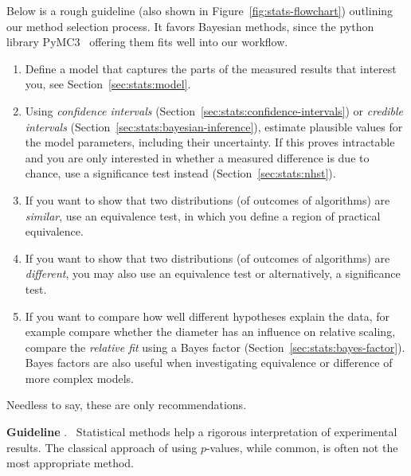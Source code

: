 \documentclass[algorithms,article,submit,moreauthors,pdftex]{Definitions/mdpi}
\newcounter{guideline}
\newcommand{\changed}[1]{#1}
\newcommand{\guideline}[1]{\par\smallskip\textbf{Guideline \theguideline\stepcounter{guideline}}.
\ #1\par\smallskip}
\begin{document}
Below is a rough guideline (also shown in Figure~\ref{fig:stats-flowchart}) outlining our method selection process.
It favors Bayesian methods, since the python library PyMC3~\cite{salvatier2016probabilistic} offering them fits well into our workflow.
\begin{enumerate}
\item Define a model that captures the parts of the measured results that interest you, see Section~\ref{sec:stats:model}.
\item Using \emph{confidence intervals} (Section~\ref{sec:stats:confidence-intervals}) or \emph{credible intervals} (Section~\ref{sec:stats:bayesian-inference}), estimate plausible values for the model parameters, including their uncertainty.
If this proves intractable and you are only interested in whether a measured difference is due to chance, use a significance test instead (Section~\ref{sec:stats:nhst}).
\item If you want to show that two distributions (of outcomes of algorithms) are \emph{similar}, use an equivalence test, in which you define a region of practical equivalence.
\item If you want to show that two distributions (of outcomes of algorithms) are \emph{different}, you may also use an equivalence test or alternatively, a significance test.
\item If you want to compare how well different hypotheses explain the data, for example compare whether the diameter has an influence on relative scaling, compare the \emph{relative fit} using a Bayes factor (Section~\ref{sec:stats:bayes-factor}). \changed{Bayes factors are also useful when investigating equivalence or difference of more complex models.}
\end{enumerate}

Needless to say, these are only recommendations.
\changed{
\guideline{Statistical methods help a rigorous interpretation of experimental results. The classical approach of using $p$-values, while common, is often not the most appropriate method.}}
\end{document}
